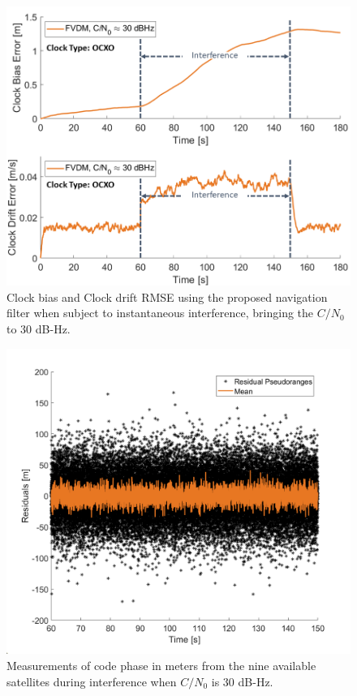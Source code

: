 \documentclass[12pt]{report}
\begin{document}
\begin{figure}[!ht]
  \centering
  \includegraphics[width=0.75\linewidth]{Figures/Results/trajectoryfigure/Slide23.PNG}
  \caption{Clock bias and Clock drift RMSE using the proposed navigation filter when subject to instantaneous interference, bringing the \(C/N_0\) to \(30\) dB-Hz.}\label{fig:Clk30}
\end{figure}

\begin{figure}[!ht]
  \centering
  \includegraphics[width=0.75\linewidth]{Figures/Results/Scenario1/Case30/codephase.png}
  \caption{Measurements of code phase in meters from the nine available satellites during interference when \(C/N_0\) is \(30\) dB-Hz.}\label{fig:codephase30}
\end{figure}
\end{document}
